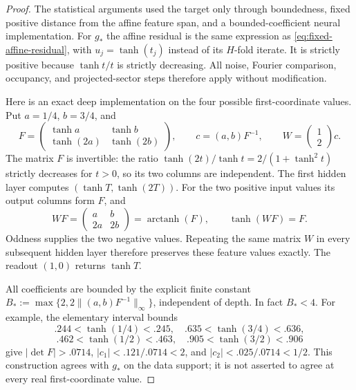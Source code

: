\begin{proof}
The statistical arguments used the target only through boundedness, fixed positive distance from the affine feature span, and a bounded-coefficient neural implementation. For $g_*$ the affine residual is the same expression as \eqref{eq:fixed-affine-residual}, with $u_j=\tanh(t_j)$ instead of its $H$-fold iterate. It is strictly positive because $\tanh t/t$ is strictly decreasing. All noise, Fourier comparison, occupancy, and projected-sector steps therefore apply without modification.

Here is an exact deep implementation on the four possible first-coordinate values. Put $a=1/4$, $b=3/4$, and
\[
 F=\begin{pmatrix}\tanh a&\tanh b\\ \tanh(2a)&\tanh(2b)\end{pmatrix},
 \qquad c=(a,b)F^{-1},\qquad
 W=\begin{pmatrix}1\\2\end{pmatrix}c.
\]
The matrix $F$ is invertible: the ratio $\tanh(2t)/\tanh t=2/(1+\tanh^2t)$ strictly decreases for $t>0$, so its two columns are independent. The first hidden layer computes $(\tanh T,\tanh(2T))$. For the two positive input values its output columns form $F$, and
\[
 WF=\begin{pmatrix}a&b\\2a&2b\end{pmatrix}
       =\operatorname{arctanh}(F),\qquad \tanh(WF)=F.
\]
Oddness supplies the two negative values. Repeating the same matrix $W$ in every subsequent hidden layer therefore preserves these feature values exactly. The readout $(1,0)$ returns $\tanh T$.

All coefficients are bounded by the explicit finite constant
$B_*:=\max\{2,2\|(a,b)F^{-1}\|_\infty\}$, independent of depth. In fact $B_*<4$. For example, the elementary interval bounds
\[
 .244<\tanh(1/4)<.245,\quad .635<\tanh(3/4)<.636,
\]
\[
 .462<\tanh(1/2)<.463,\quad .905<\tanh(3/2)<.906
\]
give $|\det F|>.0714$, $|c_1|<.121/.0714<2$, and $|c_2|<.025/.0714<1/2$. This construction agrees with $g_*$ on the data support; it is not asserted to agree at every real first-coordinate value.
\end{proof}

